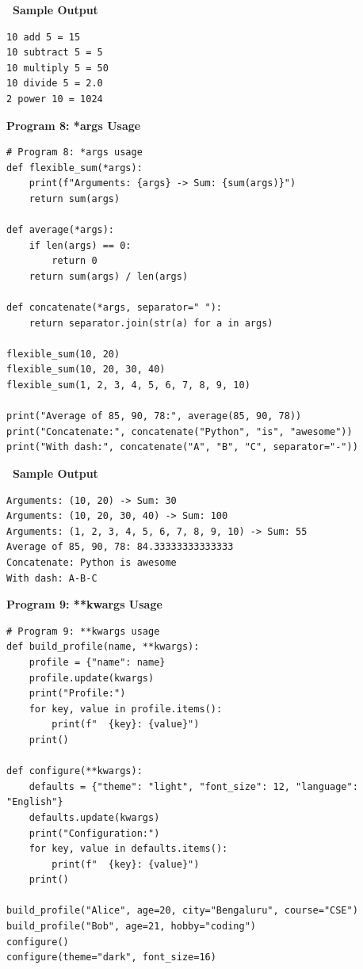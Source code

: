 \documentclass[12pt,a4paper]{article}
\newcommand{\outhead}{\noindent\colorbox{cmrgreen!25}%
  {\textbf{\small\color{cmrdark}~Sample Output~}}\par\vspace{-1pt}}
\begin{document}
\outhead
\begin{lstlisting}[style=outputstyle]
10 add 5 = 15
10 subtract 5 = 5
10 multiply 5 = 50
10 divide 5 = 2.0
2 power 10 = 1024
\end{lstlisting}

\vspace{0.5cm}

\textbf{Program 8: *args Usage}

\begin{lstlisting}
# Program 8: *args usage
def flexible_sum(*args):
    print(f"Arguments: {args} -> Sum: {sum(args)}")
    return sum(args)

def average(*args):
    if len(args) == 0:
        return 0
    return sum(args) / len(args)

def concatenate(*args, separator=" "):
    return separator.join(str(a) for a in args)

flexible_sum(10, 20)
flexible_sum(10, 20, 30, 40)
flexible_sum(1, 2, 3, 4, 5, 6, 7, 8, 9, 10)

print("Average of 85, 90, 78:", average(85, 90, 78))
print("Concatenate:", concatenate("Python", "is", "awesome"))
print("With dash:", concatenate("A", "B", "C", separator="-"))
\end{lstlisting}

\outhead
\begin{lstlisting}[style=outputstyle]
Arguments: (10, 20) -> Sum: 30
Arguments: (10, 20, 30, 40) -> Sum: 100
Arguments: (1, 2, 3, 4, 5, 6, 7, 8, 9, 10) -> Sum: 55
Average of 85, 90, 78: 84.33333333333333
Concatenate: Python is awesome
With dash: A-B-C
\end{lstlisting}

\vspace{0.5cm}

\textbf{Program 9: **kwargs Usage}

\begin{lstlisting}
# Program 9: **kwargs usage
def build_profile(name, **kwargs):
    profile = {"name": name}
    profile.update(kwargs)
    print("Profile:")
    for key, value in profile.items():
        print(f"  {key}: {value}")
    print()

def configure(**kwargs):
    defaults = {"theme": "light", "font_size": 12, "language": "English"}
    defaults.update(kwargs)
    print("Configuration:")
    for key, value in defaults.items():
        print(f"  {key}: {value}")
    print()

build_profile("Alice", age=20, city="Bengaluru", course="CSE")
build_profile("Bob", age=21, hobby="coding")
configure()
configure(theme="dark", font_size=16)
\end{lstlisting}
\end{document}
